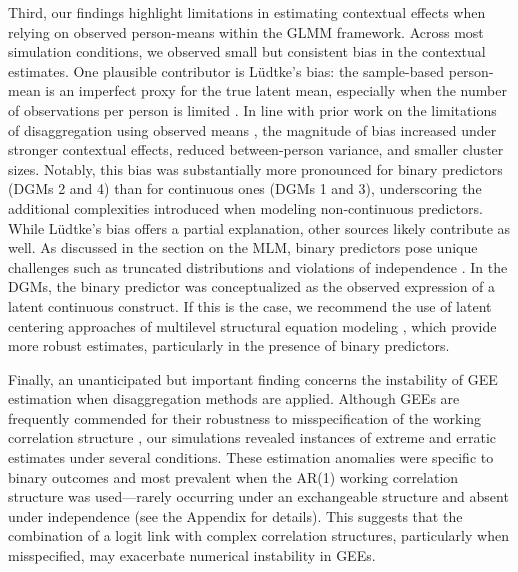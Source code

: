 \documentclass[stu]{apa7}
\begin{document}
Third, our findings highlight limitations in estimating contextual effects when relying on observed person-means within the GLMM framework. Across most simulation conditions, we observed small but consistent bias in the contextual estimates. One plausible contributor is Lüdtke’s bias: the sample-based person-mean is an imperfect proxy for the true latent mean, especially when the number of observations per person is limited \parencite{ludtke_multilevel_2008}. In line with prior work on the limitations of disaggregation using observed means \parencite{asparouhov_latent_2019}, the magnitude of bias increased under stronger contextual effects, reduced between-person variance, and smaller cluster sizes. Notably, this bias was substantially more pronounced for binary predictors (DGMs 2 and 4) than for continuous ones (DGMs 1 and 3), underscoring the additional complexities introduced when modeling non-continuous predictors. While Lüdtke’s bias offers a partial explanation, other sources likely contribute as well. As discussed in the section on the MLM, binary predictors pose unique challenges such as truncated distributions and violations of independence \parencite[see also][]{asparouhov_latent_2019}. In the DGMs, the binary predictor was conceptualized as the observed expression of a latent continuous construct. If this is the case, we recommend the use of latent centering approaches of multilevel structural equation modeling \parencite[e.g.,][]{asparouhov_latent_2019}, which provide more robust estimates, particularly in the presence of binary predictors.


Finally, an unanticipated but important finding concerns the instability of GEE estimation when disaggregation methods are applied. Although GEEs are frequently commended for their robustness to misspecification of the working correlation structure \parencite[e.g.,][]{zeger_models_1988, ballinger_using_2004}, our simulations revealed instances of extreme and erratic estimates under several conditions. These estimation anomalies were specific to binary outcomes and most prevalent when the AR(1) working correlation structure was used—rarely occurring under an exchangeable structure and absent under independence (see the Appendix for details). This suggests that the combination of a logit link with complex correlation structures, particularly when misspecified, may exacerbate numerical instability in GEEs.
\end{document}
